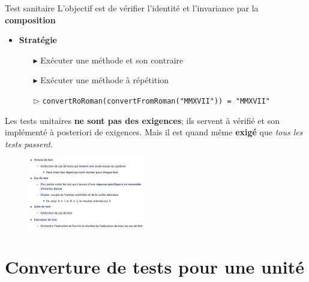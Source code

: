 \documentclass[16pt]{report}
\begin{document}
\begin{multicols*}{2}
        \begin{Concept}{Test sanitaire}{}
            L'objectif est de vérifier l'identité et l'invariance par la \textbf{composition} 
            \begin{itemize}
                \item \textbf{Stratégie}  
                \begin{itemize}
                    \item[$\blacktriangleright$] Exécuter une méthode et \textcolor{myb}{son contraire}  
                    \item[$\blacktriangleright$] Exécuter une méthode \textcolor{myb}{à répétition}  
                    \item[$\rhd$] \texttt{convertRoRoman(convertFromRoman("MMXVII")) = "MMXVII"}  
                \end{itemize}
            \end{itemize}
        \end{Concept}

        \begin{note}{}{}
            Les tests unitaires \textbf{ne sont pas des exigences}; ils servent à vérifié et 
            son implémenté à posteriori de exigences. Mais il est quand même \textbf{exigé} que 
            \textit{tous les tests passent}.   
        \end{note}


        \begin{figure}[H]
            \begin{center}
                \includegraphics[width=0.45\textwidth]{TerminologieTest}
            \end{center}
        \end{figure}

        \section{Converture de tests pour une unité}
        


\end{multicols*}
\end{document}
